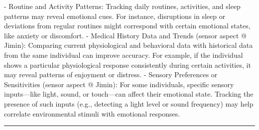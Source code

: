 \documentclass[12pt, research paper]{report}
\begin{document}
	\newline - Routine and Activity Patterns: Tracking daily routines, activities, and sleep patterns may reveal emotional cues. For instance, disruptions in sleep or deviations from regular routines might correspond with certain emotional states, like anxiety or discomfort.
	\newline - Medical History Data and Trends (sensor aspect @ Jimin): Comparing current physiological and behavioral data with historical data from the same individual can improve accuracy. For example, if the individual shows a particular physiological response consistently during certain activities, it may reveal patterns of enjoyment or distress. 
	\newline - Sensory Preferences or Sensitivities (sensor aspect @ Jimin): For some individuals, specific sensory inputs—like light, sound, or touch—can affect their emotional state. Tracking the presence of such inputs (e.g., detecting a light level or sound frequency) may help correlate environmental stimuli with emotional responses.
	
	\noindent \rule{13.85cm}{0.01cm}
	
\end{document}
